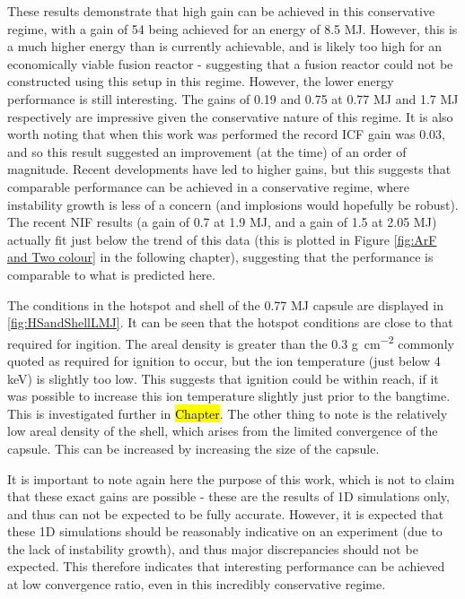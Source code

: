 These results demonstrate that high gain can be achieved in this conservative regime, with a gain of 54 being achieved for an energy of 8.5 \unit{\mega\joule}. However, this is a much higher energy than is currently achievable, and is likely too high for an economically viable fusion reactor - suggesting that a fusion reactor could not be constructed using this setup in this regime. However, the lower energy performance is still interesting. The gains of 0.19 and 0.75 at 0.77 \unit{\mega\joule} and 1.7 \unit{\mega\joule} respectively are impressive given the conservative nature of this regime. It is also worth noting that when this work was performed the record ICF gain was 0.03, and so this result suggested an improvement (at the time) of an order of magnitude. Recent developments have led to higher gains, but this suggests that comparable performance can be achieved in a conservative regime, where instability growth is less of a concern (and implosions would hopefully be robust). The recent NIF results (a gain of 0.7 at 1.9 MJ, and a gain of 1.5 at 2.05 MJ) actually fit just below the trend of this data (this is plotted in Figure \ref{fig:ArF and Two colour} in the following chapter), suggesting that the performance is comparable to what is predicted here.

The conditions in the hotspot and shell of the 0.77 \unit{\mega\joule} capsule are displayed in \ref{fig:HSandShellLMJ}. It can be seen that the hotspot conditions are close to that required for ingition. The areal density is greater than the 0.3 \unit{\gram\per\centi\meter\squared} commonly quoted as required for ignition to occur, but the ion temperature (just below 4 keV) is slightly too low. This suggests that ignition could be within reach, if it was possible to increase this ion temperature slightly just prior to the bangtime. This is investigated further in \hl{Chapter}. The other thing to note is the relatively low areal density of the shell, which arises from the limited convergence of the capsule. This can be increased by increasing the size of the capsule.

It is important to note again here the purpose of this work, which is not to claim that these exact gains are possible - these are the results of 1D simulations only, and thus can not be expected to be fully accurate. However, it is expected that these 1D simulations should be reasonably indicative on an experiment (due to the lack of instability growth), and thus major discrepancies should not be expected. This therefore indicates that interesting performance can be achieved at low convergence ratio, even in this incredibly conservative regime. 


